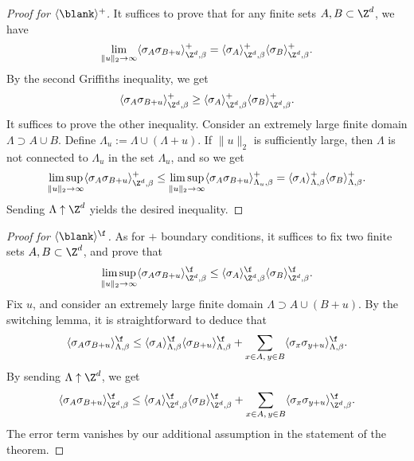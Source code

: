 \begin{proof}[Proof for $\langle\blank\rangle^+$]
    It suffices to prove that for any finite sets $A,B\subset\Z^d$,
    we have
    \[
        \lim_{\|u\|_2\to\infty}
        \langle\sigma_A\sigma_{B+u}\rangle_{\Z^d,\beta}^+
        =
        \langle\sigma_A\rangle_{\Z^d,\beta}^+
        \langle\sigma_B\rangle_{\Z^d,\beta}^+.
    \]
    By the second Griffiths inequality,
    we get
    \[
        \langle\sigma_A\sigma_{B+u}\rangle_{\Z^d,\beta}^+
        \geq
        \langle\sigma_A\rangle_{\Z^d,\beta}^+
        \langle\sigma_B\rangle_{\Z^d,\beta}^+.
    \]
    It suffices to prove the other inequality.
    Consider an extremely large finite domain $\Lambda\supset A\cup B$.
    Define $\Lambda_u:=\Lambda\cup(\Lambda+u)$.
    If $\|u\|_2$ is sufficiently large,
    then $\Lambda$ is not connected to $\Lambda_u$
    in the set $\Lambda_u$, and so we get
    \[
        \limsup_{\|u\|_2\to\infty}
        \langle\sigma_A\sigma_{B+u}\rangle_{\Z^d,\beta}^+
        \leq
        \limsup_{\|u\|_2\to\infty}
        \langle\sigma_A\sigma_{B+u}\rangle_{\Lambda_u,\beta}^+
        =
        \langle\sigma_A\rangle_{\Lambda,\beta}^+
        \langle\sigma_B\rangle_{\Lambda,\beta}^+
        .
    \]
    Sending $\Lambda\uparrow\Z^d$ yields the desired inequality.
\end{proof}

\begin{proof}[Proof for $\langle\blank\rangle^\f$]
    As for $+$ boundary conditions,
    it suffices to fix two finite sets $A,B\subset\Z^d$,
    and prove that
    \[
        \limsup_{\|u\|_2\to\infty}
        \langle\sigma_A\sigma_{B+u}\rangle_{\Z^d,\beta}^\f
        \leq
        \langle\sigma_A\rangle_{\Z^d,\beta}^\f
        \langle\sigma_B\rangle_{\Z^d,\beta}^\f
        .
    \]
    Fix $u$, and
    consider an extremely large finite domain $\Lambda\supset A\cup (B+u)$.
    By the switching lemma, it is straightforward to deduce that
    \[
        \langle\sigma_A\sigma_{B+u}\rangle_{\Lambda,\beta}^\f
        \leq
        \langle\sigma_A\rangle_{\Lambda,\beta}^\f\langle\sigma_{B+u}\rangle_{\Lambda,\beta}^\f
        +\sum_{x\in A,\,y\in B}\langle\sigma_x\sigma_{y+u}\rangle_{\Lambda,\beta}^\f.
    \]
    By sending $\Lambda\uparrow\Z^d$, we get
    \[
        \langle\sigma_A\sigma_{B+u}\rangle_{\Z^d,\beta}^\f
        \leq
        \langle\sigma_A\rangle_{\Z^d,\beta}^\f\langle\sigma_B\rangle_{\Z^d,\beta}^\f
        +\sum_{x\in A,\,y\in B}\langle\sigma_x\sigma_{y+u}\rangle_{\Z^d,\beta}^\f.
    \]
    The error term vanishes by our additional assumption in the statement of the theorem.
\end{proof}
